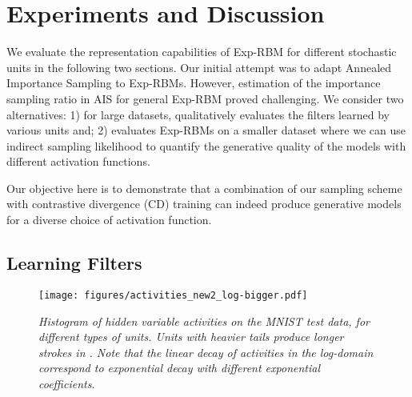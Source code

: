 \documentclass[twoside]{article}
\theoremstyle{plain}
\theoremstyle{definition}
\newtheorem{example}{Example}[section]
\theoremstyle{remark}
\newcommand{\eg}[0]{\emph{e.g.},~}
\newcommand{\refSection}[1]{\Cref{#1}}%
\newcommand{\refEq}[1]{\cref{#1}}%
\newcommand{\sfit}[1]{\ensuremath{#1}}
\newcommand{\ff}[0]{\ensuremath{\sfit{f}}}%
\newcommand{\dd}[0]{\ensuremath{\mathrm{d}}}%
\begin{document}




\section{Experiments and Discussion}\label{sec:experiments}
We evaluate the representation capabilities of Exp-RBM for different stochastic units in the following two sections.
Our initial attempt was to adapt Annealed Importance Sampling \citep[AIS;][]{salakhutdinov2008quantitative} to Exp-RBMs. 
However, estimation of the importance sampling ratio in AIS for general Exp-RBM proved challenging. We consider two alternatives: 1) for large datasets, \refSection{sec:filters} qualitatively evaluates the filters learned by various units and; 2) \refSection{sec:quant} evaluates Exp-RBMs on a smaller
dataset where we can use indirect sampling likelihood to quantify the generative quality of the models with different activation functions.
 
Our objective here is to demonstrate that a combination of our sampling scheme with contrastive divergence (CD) training can indeed
produce generative models for a diverse choice of activation function. 

\subsection{Learning Filters}\label{sec:filters}
\begin{figure}
  \centering
  \texttt{[image: figures/activities\_new2\_log-bigger.pdf]}
  \caption{\it \small Histogram of hidden variable activities on the MNIST test data, for different types of units. Units with heavier tails produce longer 
    strokes in . Note that the linear decay of activities in the log-domain correspond to exponential decay with different exponential coefficients.}\label{fig:activations}
\end{figure}
\end{document}
